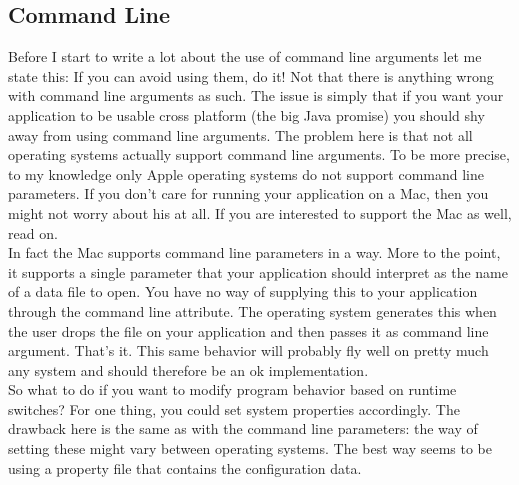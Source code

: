 \subsection{Command Line}

Before I start to write a lot about the use of command line arguments
let me state this: If you can avoid using them, do it! Not that there
is anything wrong with command line arguments as such. The issue is
simply that if you want your application to be usable cross platform
(the big Java promise) you should shy away from using command line
arguments. The problem here is that not all operating systems actually
support command line arguments. To be more precise, to my knowledge only
Apple operating systems do not support command line parameters. If you
don't care for running your application on a Mac, then you might not
worry about his at all. If you are interested to support the Mac as
well, read on.\\

In fact the Mac supports command line parameters in a way. More to the
point, it supports a single parameter that your application should
interpret as the name of a data file to open. You have no way of
supplying this to your application through the command line attribute.
The operating system generates this when the user drops the file on your
application and then passes it as command line argument. That's it. This
same behavior will probably fly well on pretty much any system and
should therefore be an ok implementation.\\

So what to do if you want to modify program behavior based on runtime
switches? For one thing, you could set system properties accordingly.
The drawback here is the same as with the command line parameters: the
way of setting these might vary between operating systems. The best way
seems to be using a property file that contains the configuration
data.\\
